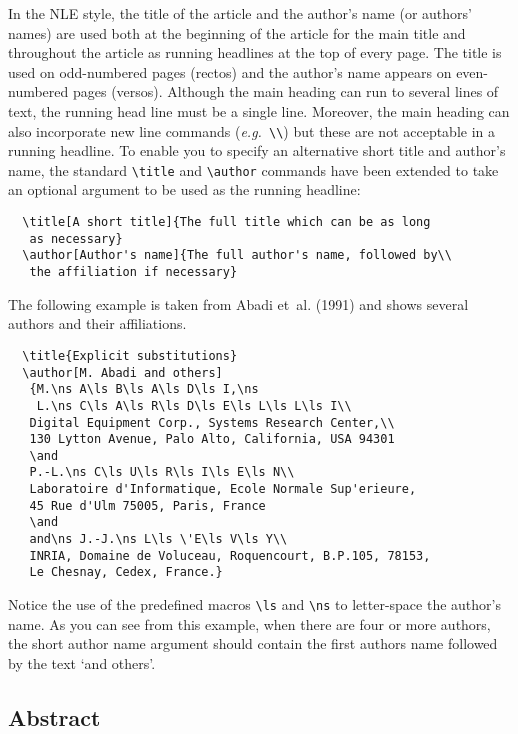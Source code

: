 \documentclass{cnle}
\newcommand\eg{{\it e.g.\ }}
\begin{document}
In the NLE style, the title of the article and the author's name (or authors'
names) are used both at the beginning of the article for the main title and
throughout the article as running headlines at the top of every page.
The title is used on odd-numbered pages (rectos) and the author's name appears
on even-numbered pages (versos).
Although the main heading can run to several lines of text, the running head
line must be a single line.
Moreover, the main heading can also incorporate new line commands
(\eg \verb"\\") but these are not acceptable in a running headline.
To enable you to specify an alternative short title and author's name, the
standard \verb"\title" and \verb"\author" commands have been extended to take
an optional argument to be used as the running headline:
%
\begin{verbatim}
  \title[A short title]{The full title which can be as long
   as necessary}
  \author[Author's name]{The full author's name, followed by\\
   the affiliation if necessary}
\end{verbatim}
%
The following example is taken from Abadi et~al. (1991) and
shows several authors and their affiliations.
%
\begin{verbatim}
  \title{Explicit substitutions}
  \author[M. Abadi and others]
   {M.\ns A\ls B\ls A\ls D\ls I,\ns
    L.\ns C\ls A\ls R\ls D\ls E\ls L\ls L\ls I\\
   Digital Equipment Corp., Systems Research Center,\\
   130 Lytton Avenue, Palo Alto, California, USA 94301
   \and
   P.-L.\ns C\ls U\ls R\ls I\ls E\ls N\\
   Laboratoire d'Informatique, Ecole Normale Sup'erieure,
   45 Rue d'Ulm 75005, Paris, France
   \and
   and\ns J.-J.\ns L\ls \'E\ls V\ls Y\\
   INRIA, Domaine de Voluceau, Roquencourt, B.P.105, 78153,
   Le Chesnay, Cedex, France.}
\end{verbatim}
Notice the use of the predefined macros \verb"\ls" and \verb"\ns" to
letter-space the author's name. As you can see from this example, when
there are four or more authors, the short author name argument should
contain the first authors name followed by the text `and others'.

\subsection{Abstract}
\end{document}
